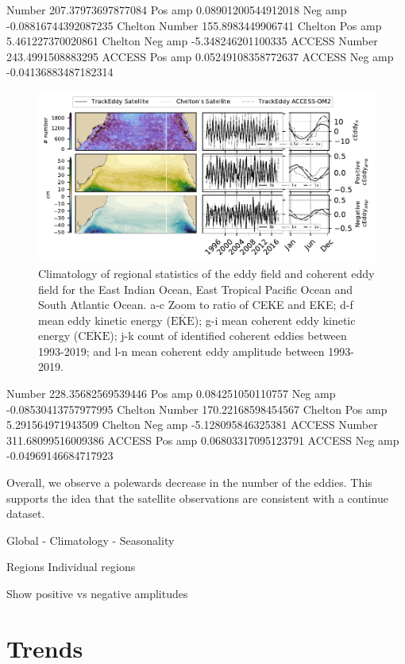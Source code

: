 \documentclass[draft]{agujournal2019}
\newcommand{\MEKE}{\overline{\textrm{EKE}}}
\newcommand{\MCEKE}{\overline{\textrm{CEKE}}}
\begin{document}
	Number 207.37973697877084
	Pos amp 0.08901200544912018
	Neg amp -0.08816744392087235
	Chelton Number 155.8983449906741
	Chelton Pos amp 5.461227370020861
	Chelton Neg amp -5.348246201100335
	ACCESS Number 243.4991508883295
	ACCESS Pos amp 0.05249108358772637
	ACCESS Neg amp -0.04136883487182314

	\begin{figure}
	    \centering
	    \includegraphics[width=1\textwidth]{figures/regional_eke_ceke_stats_2.pdf}
	    \caption{Climatology of regional statistics of the eddy field and coherent eddy field for the East Indian Ocean, East Tropical Pacific Ocean and South Atlantic Ocean. a-c Zoom to ratio of CEKE and EKE; d-f  mean eddy kinetic energy ($\MEKE$); g-i mean coherent eddy kinetic energy ($\MCEKE$); j-k count of identified coherent eddies between 1993-2019; and l-n mean coherent eddy amplitude between 1993-2019.}
	    \label{fig:my_label}
	\end{figure}

	Number 228.35682569539446
	Pos amp 0.084251050110757
	Neg amp -0.08530413757977995
	Chelton Number 170.22168598454567
	Chelton Pos amp 5.291564971943509
	Chelton Neg amp -5.128095846325381
	ACCESS Number 311.68099516009386
	ACCESS Pos amp 0.06803317095123791
	ACCESS Neg amp -0.04969146684717923




Overall, we observe a polewards decrease in the number of the eddies. This supports the idea that the satellite observations are consistent with a continue dataset.

	Global 
	- Climatology
	- Seasonality 

	Regions
		Individual regions

	Show positive vs negative amplitudes

	
	\section{Trends}
\end{document}
